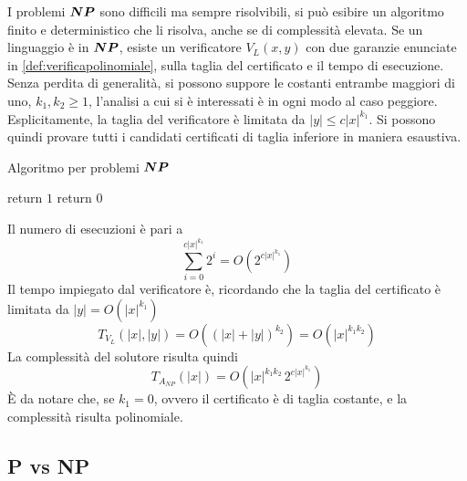 I problemi $\bm{NP}$ sono difficili ma sempre risolvibili, si può esibire un algoritmo finito e deterministico che li risolva, anche se di complessità elevata.
Se un linguaggio è in $\bm{NP}$, esiste un verificatore $V_L ( x,y )$ con due garanzie enunciate in \ref{def:verificapolinomiale}, sulla taglia del certificato e il tempo di esecuzione.
Senza perdita di generalità, si possono suppore le costanti entrambe maggiori di uno, $k_1, k_2 \geq 1$, l'analisi a cui si è interessati è in ogni modo al caso peggiore.
Esplicitamente, la taglia del verificatore è limitata da
$ |y| \leq c |x|^{k_1} $.
Si possono quindi provare tutti i candidati certificati di taglia inferiore in maniera esaustiva.
\begin{algorithm}[H]
\caption{Algoritmo per problemi $\bm{NP}$}\label{alg:solutorenp}
\begin{algorithmic}[1]
                \State return $1$
            \EndIf
        \EndFor
        \State return $0$
    \EndProcedure
\end{algorithmic}
\end{algorithm}
\noindent
Il numero di esecuzioni è pari a 
\begin{equation*}
    \sum_{i=0}^{c |x|^{k_1}} 2^i =
    O \left(
        2^{c |x|^{k_1}}
    \right)
\end{equation*}
Il tempo impiegato dal verificatore è, ricordando che la taglia del certificato è limitata da
$
    |y| = O \left( |x|^{k_{1}} \right)
$
\begin{equation*}
    T_{V_{L}} (|x|, |y|) =
    O \left( \left( |x|+|y| \right)^{k_{2}} \right) = 
    O \left( |x|^{k_1 k_2} \right)
\end{equation*}
La complessità del solutore risulta quindi
\begin{equation*}
    T_{A_{NP}} (|x|) =
    O \left(
        |x|^{k_1 k_2}
        \,
        2^{c |x|^{k_1}}
    \right)
\end{equation*}
È da notare che, se $k_1 = 0$, ovvero il certificato è di taglia costante, e la complessità risulta polinomiale.

\subsection{P vs NP}
\label{sss:pvsnp}

